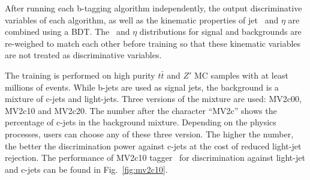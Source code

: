 \par After running each b-tagging algorithm independently, the output discriminative variables of each algorithm, as well as the kinematic properties of jet \pt~and $\eta$ are combined using a BDT. The \pt~and $\eta$ distributions for signal and backgrounds are re-weighed to match each other before training so that these kinematic variables are not treated as discriminative variables.
\par The training is performed on high purity $t\bar{t}$ and $Z'$ MC samples with at least millions of events. While b-jets are used as signal jets, 
the background is a mixture of c-jets and light-jets. Three versions of the mixture are used: MV2c00, MV2c10 and MV2c20. The number after the character ``MV2c''
shows the percentage of c-jets in the background mixture. Depending on the physics processes, users can choose any of these three version.
The higher the number, the better the discrimination power against c-jets at the cost of reduced light-jet rejection. 
The performance of MV2c10 tagger~\cite{Varni:2655785} for discrimination against light-jet and c-jets can be found in Fig.~\ref{fig:mv2c10}.


